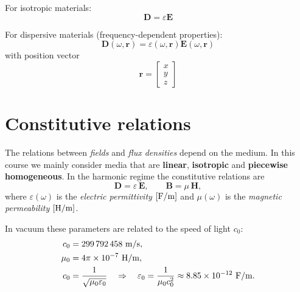For isotropic materials:
\[
\mathbf{D} = \varepsilon \mathbf{E}
\]

For dispersive materials (frequency-dependent properties):
\[
\mathbf{D}(\omega, \mathbf{r}) = \varepsilon(\omega, \mathbf{r}) \mathbf{E}(\omega, \mathbf{r})
\]
with position vector
\[
\mathbf{r} = 
\begin{bmatrix}
x \\ y \\ z
\end{bmatrix}
\]


\section{Constitutive relations}

The relations between \emph{fields} and \emph{flux densities} depend on the medium.  
In this course we mainly consider media that are \textbf{linear}, \textbf{isotropic} and \textbf{piecewise homogeneous}.  
In the harmonic regime the constitutive relations are
\begin{equation}
    \mathbf{D} = \varepsilon\,\mathbf{E}, 
    \qquad 
    \mathbf{B} = \mu\,\mathbf{H},
\end{equation}
where $\varepsilon(\omega)$ is the \emph{electric permittivity} $[{\rm F/m}]$ and $\mu(\omega)$ is the \emph{magnetic permeability} $[{\rm H/m}]$.

In vacuum these parameters are related to the speed of light $c_0$:
\begin{align}
    c_0 &= 299\,792\,458~{\rm m/s}, \\
    \mu_0 &= 4\pi \times 10^{-7}~{\rm H/m},\\
    c_0 &= \frac{1}{\sqrt{\mu_0 \varepsilon_0}}
    \quad\Rightarrow\quad
    \varepsilon_0=\frac{1}{\mu_0 c_0^2}\approx 8.85\times 10^{-12}~{\rm F/m}.
\end{align}

